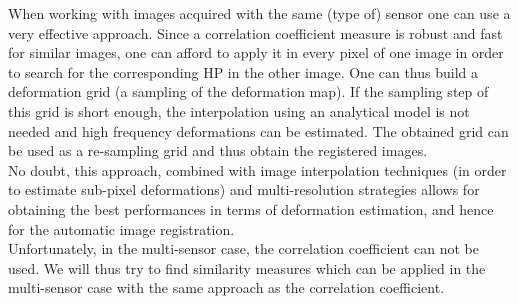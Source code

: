 



When
working with images acquired with the same (type of) sensor one can
use a very effective approach. Since a correlation coefficient measure
is robust and fast for similar images, one can afford to apply it in
every pixel of one image in order to search for the corresponding
HP in the other image. One can thus build a deformation
grid (a sampling of the deformation map). If the sampling step of this grid is short enough, the
interpolation using an analytical model is not needed and high
frequency deformations can be estimated. The obtained grid can be used
as a re-sampling grid and thus obtain the registered images.\\

No doubt, this approach, combined with image interpolation techniques
(in order to estimate sub-pixel deformations) and multi-resolution
strategies allows for obtaining the best performances in terms of
deformation estimation, and hence for the automatic image
registration.\\

Unfortunately, in the multi-sensor case, the correlation coefficient
can not be used. We will thus try to find similarity measures which can be
applied in the multi-sensor case with the same approach as the
correlation coefficient.\\

